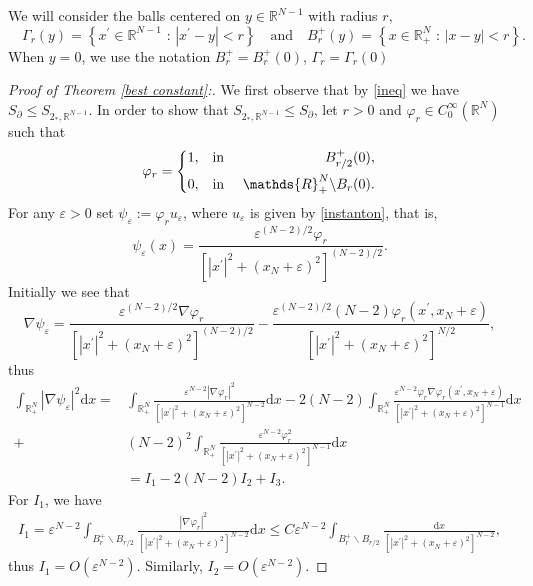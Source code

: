 \documentclass[12pt,reqno]{amsart}
\begin{document}
We will consider the balls centered on $y\in\mathds{R}^{N-1}$  with radius $r,$
	\[
	\quad\Gamma_r(y)=\left\{ x^\prime\in\mathds{R}^{N-1}\text{ : }|x^\prime-y|<r \right\}\quad\text{and}\quad B_{r}^+(y)=\left\{ x\in \mathds{R}_{+}^{N}\text{ : } |x-y|<r  \right\}.
	\]
When $y=0$, we use the notation $B_{r}^+=B_{r}^+(0)$, $\Gamma_r=\Gamma_r(0)$

\begin{proof}[Proof of Theorem \ref{best constant}:]
We first observe that by \eqref{ineq} we have $S_{\partial}\leq S_{2_\ast,\mathds{R}^{N-1}}$. In order to show that $S_{2_\ast,\mathds{R}^{N-1}}\leq S_{\partial}$, let $r>0$ and $\varphi_r \in C^\infty_0(\mathds{R}^N)$ such that
\begin{equation*}
		\varphi_r=\left\{
		\begin{aligned}
			1, \quad&\mbox{in }&\ B_{r/2}^+(0),
			\vspace{0.2cm}\\
			0, \quad &\mbox{in }&\mathds{R}^{N}_+\backslash B_r(0).
		\end{aligned}
		\right. 
	\end{equation*}
For any  $\varepsilon>0$ set $\psi_\varepsilon:= \varphi_r u_\varepsilon$, where $u_\varepsilon$ is given by \eqref{instanton}, that is,
\[
\psi_\varepsilon(x)=\frac{\varepsilon^{(N-2)/2}\varphi_r}{[|x^\prime|^2+(x_N+\varepsilon)^2]^{(N-2)/2}}.
\]
Initially we see that
\[
\nabla \psi_\varepsilon = \frac{\varepsilon^{(N-2)/2}\nabla \varphi_r}{[|x^\prime|^2+(x_N+\varepsilon)^2]^{(N-2)/2}}-\frac{\varepsilon^{(N-2)/2}(N-2)\varphi_r(x^\prime,x_N+\varepsilon)}{[|x^\prime|^2+(x_N+\varepsilon)^2]^{N/2}},
\]
thus
\begin{align*}
    \int_{\mathds{R}^N_+}|\nabla \psi_\varepsilon|^2\mathrm{d}x=& \int_{\mathds{R}^N_+}\frac{\varepsilon^{N-2}|\nabla \varphi_r|^2}{[|x^\prime|^2+(x_N+\varepsilon)^2]^{N-2}}\mathrm{d}x-2(N-2)\int_{\mathds{R}^N_+}\frac{\varepsilon^{N-2}\varphi_r \nabla \varphi_r(x^\prime,x_N+\varepsilon)}{[|x^\prime|^2+(x_N+\varepsilon)^2]^{N-1}}\mathrm{d}x\\
    +&(N-2)^2\int_{\mathds{R}^N_+} \frac{\varepsilon^{N-2}\varphi_r^2}{[|x^\prime|^2+(x_N+\varepsilon)^2]^{N-1}}\mathrm{d}x\\
    &= I_1-2(N-2)I_2+I_3.
\end{align*}
For $I_1$, we have
\begin{align*}
    I_1 = \varepsilon^{N-2}\int_{B_r^+\backslash B_{r/2}}\frac{|\nabla \varphi_r|^2}{[|x^\prime|^2+(x_N+\varepsilon)^2]^{N-2}}\mathrm{d}x\leq C \varepsilon^{N-2}\int_{B_r^+\backslash B_{r/2}}\frac{\mathrm{d}x}{[|x^\prime|^2+(x_N+\varepsilon)^2]^{N-2}}, 
\end{align*}
thus $I_1=O(\varepsilon^{N-2})$. Similarly, $I_2=O(\varepsilon^{N-2})$.


\end{proof}
\end{document}
